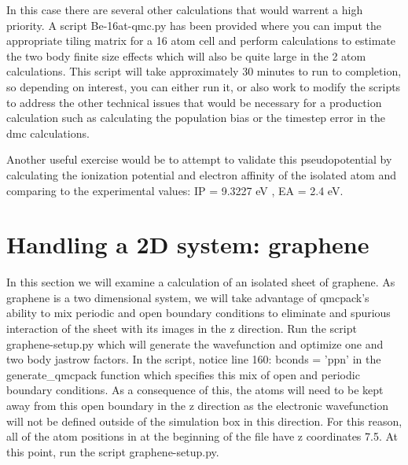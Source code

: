In this case there are several other calculations that would warrent a high priority.  A script Be-16at-qmc.py has been provided where you can imput the appropriate tiling matrix for a 16 atom cell and perform calculations to estimate the two body finite size effects which will also be quite large in the 2 atom calculations.  This script will take approximately 30 minutes to run to completion, so depending on interest,  you can either run it, or also work to modify the scripts to address the other technical issues that would be necessary for a production calculation such as calculating the population bias or the timestep error in the dmc calculations.  

Another useful exercise would be to attempt to validate this pseudopotential by calculating the ionization potential and electron affinity of the isolated atom and comparing to the experimental values:  IP = 9.3227 eV , EA = 2.4 eV.

\section{Handling a 2D system: graphene}
In this section we will examine a calculation of an isolated sheet of graphene.  As graphene is a two dimensional system, we will take advantage of qmcpack's ability to mix periodic and open boundary conditions to eliminate and spurious interaction of the sheet with its images in the z direction.  Run the script graphene-setup.py which will generate the wavefunction and optimize one and two body jastrow factors.  In the script, notice line 160: bconds = 'ppn' in the generate\_qmcpack function which specifies this mix of open and periodic boundary conditions.  As a consequence of this, the atoms will need to be kept away from this open boundary in the z direction as the electronic wavefunction will not be defined outside of the simulation box in this direction.  For this reason, all of the atom positions in at the beginning of the file have z coordinates 7.5.  At this point, run the script graphene-setup.py.

